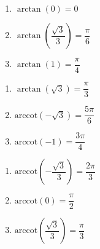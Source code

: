 \documentclass{ximera}
\begin{document}
\begin{multicols}{3} 

\begin{enumerate}

\setcounter{enumi}{\value{HW}}

\item $\arctan \left( 0 \right) = 0$ 
\item $\arctan \left( \dfrac{\sqrt{3}}{3} \right) = \dfrac{\pi}{6}$
\item $\arctan \left( 1 \right) = \dfrac{\pi}{4}$ 

\setcounter{HW}{\value{enumi}}

\end{enumerate}

\end{multicols}

\begin{multicols}{3} 

\begin{enumerate}

\setcounter{enumi}{\value{HW}}

\item $\arctan \left( \sqrt{3} \right) = \dfrac{\pi}{3}$ 
\item $\mbox{arccot} \left( -\sqrt{3} \right) = \dfrac{5\pi}{6}$
\item $\mbox{arccot} \left( -1 \right) = \dfrac{3\pi}{4}$

\setcounter{HW}{\value{enumi}}

\end{enumerate}

\end{multicols}

\begin{multicols}{3} 

\begin{enumerate}

\setcounter{enumi}{\value{HW}}

\item $\mbox{arccot} \left( -\dfrac{\sqrt{3}}{3} \right) = \dfrac{2\pi}{3}$
\item $\mbox{arccot} \left( 0 \right) = \dfrac{\pi}{2}$ 
\item $\mbox{arccot} \left( \dfrac{\sqrt{3}}{3} \right) = \dfrac{\pi}{3}$

\setcounter{HW}{\value{enumi}}

\end{enumerate}

\end{multicols}
\end{document}
